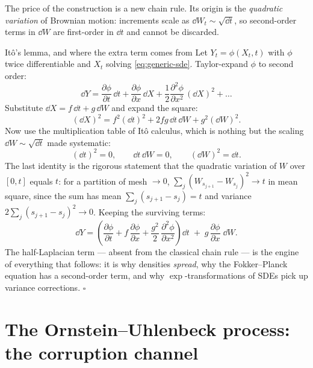 The price of the construction is a new chain rule. Its origin is the
\emph{quadratic variation} of Brownian motion: increments scale as
$\dd W_t \sim \sqrt{\dd t}$, so second-order terms in $\dd W$ are
first-order in $\dd t$ and cannot be discarded.

\begin{toolbox}{It\^o's lemma, and where the extra term comes from}
Let $Y_t = \phi(X_t, t)$ with $\phi$ twice differentiable and $X_t$ solving
\eqref{eq:generic-sde}. Taylor-expand $\phi$ to second order:
\begin{equation*}
  \dd Y
  = \frac{\partial \phi}{\partial t}\,\dd t
  + \frac{\partial \phi}{\partial x}\,\dd X
  + \frac{1}{2} \frac{\partial^2 \phi}{\partial x^2}\,(\dd X)^2
  + \dots
\end{equation*}
Substitute $\dd X = f\,\dd t + g\,\dd W$ and expand the square:
\begin{equation*}
  (\dd X)^2 = f^2 (\dd t)^2 + 2 f g\, \dd t\, \dd W + g^2 (\dd W)^2 .
\end{equation*}
Now use the multiplication table of It\^o calculus, which is nothing but the
scaling $\dd W \sim \sqrt{\dd t}$ made systematic:
\begin{equation*}
  (\dd t)^2 = 0, \qquad \dd t\, \dd W = 0, \qquad (\dd W)^2 = \dd t .
\end{equation*}
The last identity is the rigorous statement that the quadratic variation of
$W$ over $[0,t]$ equals $t$: for a partition of mesh $\to 0$,
$\sum_j (W_{s_{j+1}} - W_{s_j})^2 \to t$ in mean square, since the sum has
mean $\sum_j (s_{j+1} - s_j) = t$ and variance
$2\sum_j (s_{j+1}-s_j)^2 \to 0$. Keeping the surviving terms:
\begin{equation*}
  \dd Y = \left(
    \frac{\partial \phi}{\partial t}
    + f\,\frac{\partial \phi}{\partial x}
    + \frac{g^2}{2}\,\frac{\partial^2 \phi}{\partial x^2}
  \right) \dd t
  \;+\; g\,\frac{\partial \phi}{\partial x}\; \dd W .
\end{equation*}
The half-Laplacian term --- absent from the classical chain rule --- is the
engine of everything that follows: it is why densities \emph{spread}, why
the Fokker--Planck equation has a second-order term, and why
$\exp$-transformations of SDEs pick up variance corrections.
\hfill$\square$
\end{toolbox}

\section{The Ornstein--Uhlenbeck process: the corruption channel}
\label{sec:ou}

